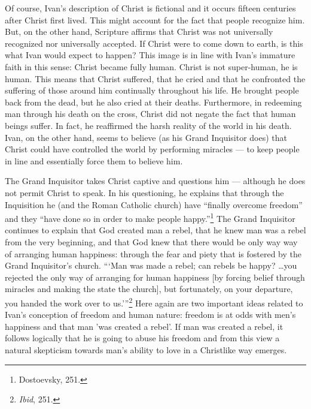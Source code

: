 Of course, Ivan's description of Christ is fictional and it occurs fifteen centuries after Christ first lived. This might account for the fact that people recognize him. But, on the other hand, Scripture affirms that Christ was not universally recognized nor universally accepted. If Christ were to come down to earth, is this what Ivan would expect to happen? This image is in line with Ivan's immature faith in this sense: Christ became fully human. Christ is not super-human, he is human. This means that Christ suffered, that he cried and that he confronted the suffering of those around him continually throughout his life. He brought people back from the dead, but he also cried at their deaths. Furthermore, in redeeming man through his death on the cross, Christ did not negate the fact that human beings suffer. In fact, he reaffirmed the harsh reality of the world in his death. Ivan, on the other hand, seems to believe (as his Grand Inquisitor does) that Christ could have controlled the world by performing miracles --- to keep people in line and essentially force them to believe him.

The Grand Inquisitor takes Christ captive and questions him --- although he does not permit Christ to speak. In his questioning, he explains that through the Inquisition he (and the Roman Catholic church) have ``finally overcome freedom'' and they ``have done so in order to make people happy.''\footnote{Dostoevsky, 251.} The Grand Inquisitor continues to explain that God created man a rebel, that he knew man was a rebel from the very beginning, and that God knew that there would be only way way of arranging human happiness: through the fear and piety that is fostered by the Grand Inquisitor's church. ```Man was made a rebel; can rebels be happy? \ldots you rejected the only way of arranging for human happiness [by forcing belief through miracles and making the state the church], but fortunately, on your departure, you handed the work over to us.'\thinspace''\footnote{\emph{Ibid}, 251.} Here again are two important ideas related to Ivan's conception of freedom and human nature: freedom is at odds with men's happiness and that man 'was created a rebel'. If man was created a rebel, it follows logically that he is going to abuse his freedom and from this view a natural skepticism towards man's ability to love in a Christlike way emerges.

